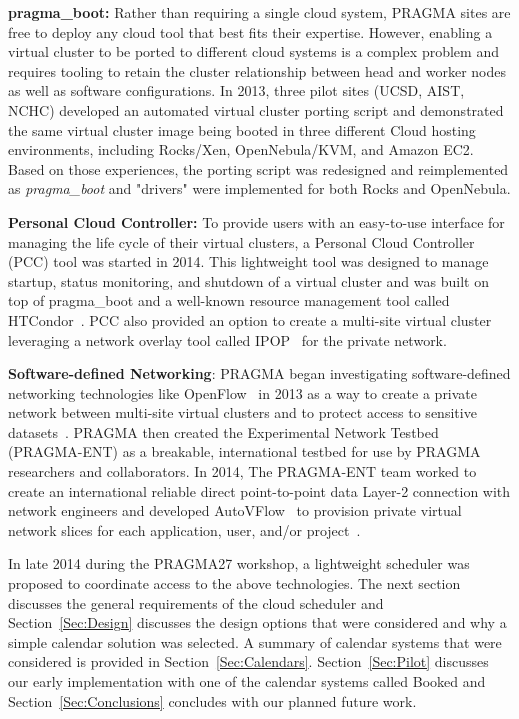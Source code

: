 \documentclass{acm_proc_article-sp}
\begin{document}
\textbf{pragma\_boot:}  Rather than requiring a single cloud system, PRAGMA sites are free to  deploy any cloud tool that best fits their expertise. However, enabling a virtual cluster to be ported to different cloud systems is a complex problem and requires tooling to retain the cluster relationship between head and worker nodes as well as software configurations.  In 2013, three pilot sites (UCSD, AIST, NCHC) developed an automated virtual cluster porting script and demonstrated the same virtual cluster image being booted in three different Cloud hosting environments, including Rocks/Xen, OpenNebula/KVM, and Amazon EC2.  Based on those experiences, the porting script was redesigned and reimplemented as \textit{pragma\_boot} and "drivers" were implemented for both Rocks and OpenNebula.

\textbf{Personal Cloud Controller:}  To provide users with an easy-to-use interface for managing the life cycle of their virtual clusters, a Personal Cloud Controller (PCC) tool was started in 2014. This lightweight tool was designed to manage startup,  status monitoring, and shutdown  of a virtual cluster and was built on top of pragma\_boot and a well-known resource management tool called HTCondor~\cite{condor}.   PCC also provided an option to create a multi-site virtual cluster leveraging a network overlay tool called IPOP~\cite{ipop} for the private network.

\textbf{Software-defined Networking}:   PRAGMA began investigating software-defined networking technologies like OpenFlow~\cite{openflow} in 2013 as a way to create a private network between multi-site virtual clusters and to protect access to sensitive datasets~\cite{pragmaReport2013}.  PRAGMA then created the Experimental Network Testbed (PRAGMA-ENT) as a breakable, international testbed for use by PRAGMA researchers and collaborators.  In 2014, The PRAGMA-ENT team worked to create an international reliable direct point-to-point data Layer-2 connection with network engineers and developed AutoVFlow~\cite{autovflow} to provision private virtual network slices for each application, user, and/or project~\cite{pragmaReport2014}.  

In late 2014 during the PRAGMA27 workshop, a lightweight scheduler was proposed to coordinate access to the above technologies.  The next section discusses the general requirements of the cloud scheduler and Section~\ref{Sec:Design} discusses the design options that were considered and why a simple calendar solution was selected.  A summary of calendar systems that were considered is provided in Section~\ref{Sec:Calendars}.  Section~\ref{Sec:Pilot} discusses our early implementation with one of the calendar systems called Booked and Section~\ref{Sec:Conclusions} concludes with our planned future work.  
\end{document}
